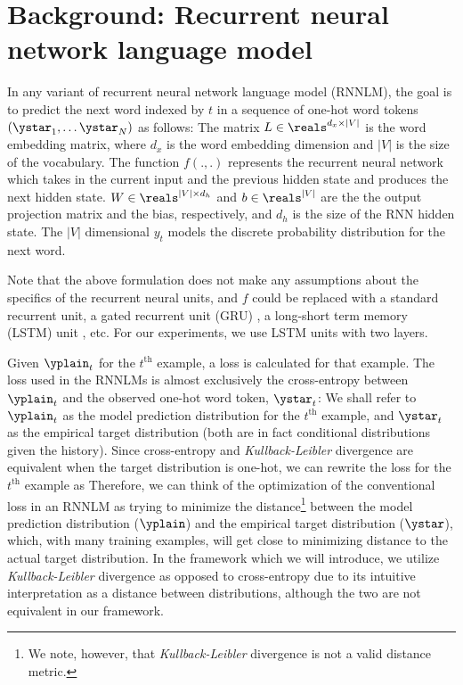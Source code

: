 \section{Background: Recurrent neural network language model}
In any variant of recurrent neural network language model (RNNLM), the goal is to predict the next word indexed by $t$ in a sequence of one-hot word tokens $(\ystar_1,\ldots \ystar_N)$ as follows:
The matrix $L\in\reals^{d_x\times |V|}$ is the word embedding matrix, where $d_x$ is the word embedding dimension and $|V|$ is the size of the vocabulary. The function $f(.,.)$ represents the recurrent neural network which takes in the current input and the previous hidden state and produces the next hidden state. $W\in\reals^{|V| \times d_h}$ and $b\in\reals^{|V| }$ are the the output projection matrix and the bias, respectively, and $d_h$ is the size of the RNN hidden state. The $|V|$ dimensional $y_t$ models the discrete probability distribution for the next word.

Note that the above formulation does not make any assumptions about the specifics of the recurrent neural units, and $f$ could be replaced with a standard recurrent unit, a gated recurrent unit (GRU) \citep{cho2014properties}, a long-short term memory (LSTM) unit \citep{hochreiter1997long}, etc. For our experiments, we use LSTM units with two layers.

Given $\yplain_t$ for the $t^\text{th}$ example, a loss is calculated for that example. The loss used in the RNNLMs is almost exclusively the cross-entropy between  $\yplain_t$ and the observed one-hot word token, $\ystar_t$:
We shall refer to $\yplain_t$ as the model prediction distribution for the $t^\text{th}$ example, and $\ystar_t$ as the empirical target distribution (both are in fact conditional distributions given the history). Since cross-entropy and \emph{Kullback-Leibler} divergence
are equivalent when the target distribution is one-hot, we can rewrite the loss for the $t^\text{th}$ example as
Therefore, we can think of the optimization of the conventional loss in an RNNLM as trying to minimize the distance\footnote{We note, however, that \emph{Kullback-Leibler} divergence is not a valid distance metric. } between the model prediction distribution ($\yplain$) and the empirical target distribution ($\ystar$), which, with many training examples, will get close to minimizing distance to the actual target distribution. In the framework which we will introduce, we utilize \emph{Kullback-Leibler} divergence as opposed to cross-entropy due to its intuitive interpretation as a distance between distributions, although the two are not equivalent in our framework.


